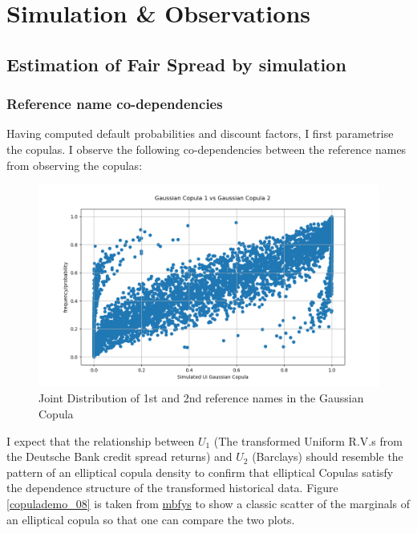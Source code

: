 \documentclass{report}
\theoremstyle{plain}
\theoremstyle{definition}
\begin{document}
\chapter{Simulation \& Observations}

\section{Estimation of Fair Spread by simulation}

\subsection{Reference name co-dependencies}

Having computed default probabilities and discount factors, I first parametrise the copulas. I observe the following co-dependencies between the reference names from observing the copulas:

\begin{figure}[H]
	\begin{center}
		\includegraphics[width=15cm]{Gaussian_Copula_1_vs_Gaussian_Copula_2.png}
		\caption{Joint Distribution of 1st and 2nd reference names in the Gaussian Copula} 
		\label{Gaussian_Copula_1_vs_Gaussian_Copula_2}
	\end{center}
\end{figure}

I expect that the relationship between $U_1$ (The transformed Uniform R.V.s from the Deutsche Bank credit spread returns) and $U_2$ (Barclays) should resemble the pattern of an elliptical copula density to confirm that elliptical Copulas satisfy the dependence structure of the transformed historical data. Figure \ref{copulademo_08} is taken from  \href{http://www.mbfys.ru.nl/~robvdw/CNP04/LAB_ASSIGMENTS/LAB05_CN05/MATLAB2007b/stats/html/copulademo.html}{mbfys} to show a classic scatter of the marginals of an elliptical copula so that one can compare the two plots.
\end{document}
